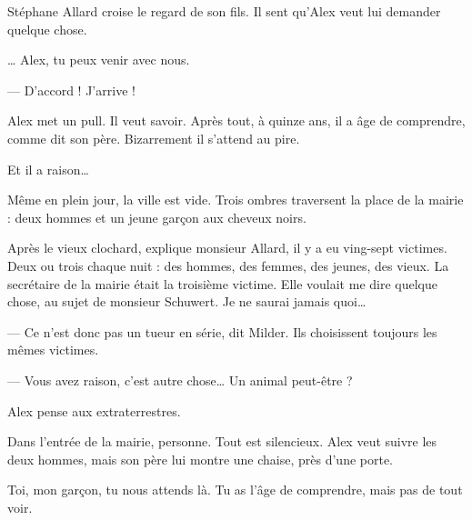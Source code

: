 Stéphane Allard croise le regard de son fils. Il sent qu'Alex veut lui demander quelque chose.

\og \ldots{} Alex, tu peux venir avec nous.

--- D'accord ! J'arrive ! \fg{}

Alex met un pull. Il veut savoir. Après tout, à quinze ans, il a âge de comprendre, comme dit son père. Bizarrement il s'attend au
pire.

Et il a raison\ldots{}

Même en plein jour, la ville est vide. Trois ombres traversent la place de la mairie : deux hommes et un jeune gar\c{c}on aux
cheveux noirs.

\og Après le vieux clochard, explique monsieur Allard, il y a eu ving-sept victimes. Deux ou trois chaque nuit : des hommes, des
femmes, des jeunes, des vieux. La secrétaire de la mairie était la troisième victime. Elle voulait me dire quelque chose, au sujet
de monsieur Schuwert. Je ne saurai jamais quoi\ldots{}

--- Ce n'est donc pas un tueur en série, dit Milder. Ils choisissent toujours les mêmes victimes.

--- Vous avez raison, c'est autre chose\ldots{} Un animal peut-être ? \fg{}

Alex pense aux extraterrestres.

Dans l'entrée de la mairie, personne. Tout est silencieux. Alex veut suivre les deux hommes, mais son père lui montre une chaise,
près d'une porte.

\og Toi, mon gar\c{c}on, tu nous attends là. Tu as l'âge de comprendre, mais pas de tout voir. \fg{}
